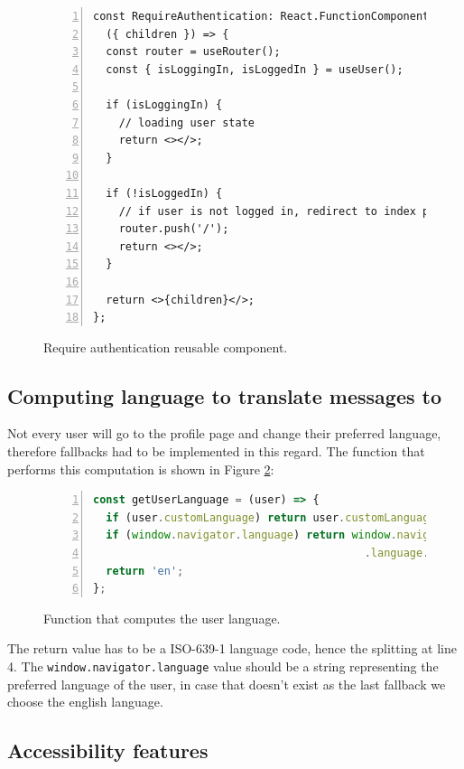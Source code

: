 \begin{figure}[H]
\begin{lstlisting}[numbers=left]
const RequireAuthentication: React.FunctionComponent = 
  ({ children }) => {
  const router = useRouter();
  const { isLoggingIn, isLoggedIn } = useUser();

  if (isLoggingIn) {
    // loading user state
    return <></>;
  }

  if (!isLoggedIn) {
    // if user is not logged in, redirect to index page
    router.push('/');
    return <></>;
  }

  return <>{children}</>;
};
\end{lstlisting}
\caption{Require authentication reusable component.}
\label{figure:frontend-require-authentication}
\end{figure}

\subsection{Computing language to translate messages to}

Not every user will go to the profile page and change their preferred language, therefore fallbacks had to be implemented in this regard. The function that performs this computation is shown in Figure \ref{figure:frontend-get-user-language}:

\begin{figure}[H]
\begin{lstlisting}[numbers=left,language=JavaScript]
const getUserLanguage = (user) => {
  if (user.customLanguage) return user.customLanguage;
  if (window.navigator.language) return window.navigator
                                          .language.split('-')[0];
  return 'en';
};
\end{lstlisting}
\caption{Function that computes the user language.}
\label{figure:frontend-get-user-language}
\end{figure}

The return value has to be a ISO-639-1 language code, hence the splitting at line 4. The \verb|window.navigator.language| value should be a string representing the preferred language of the user, in case that doesn't exist as the last fallback we choose the english language.


\subsection{Accessibility features}

